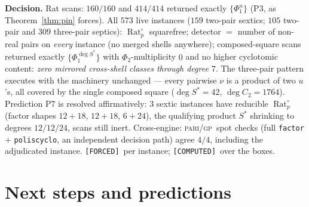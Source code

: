 \documentclass[11pt]{article}
\newcommand{\F}{\textnormal{\texttt{[FORCED]}}}
\newcommand{\C}{\textnormal{\texttt{[COMPUTED]}}}
\newcommand{\Rat}{\operatorname{Rat}}
\newcommand{\gp}{\textsc{pari/gp}}
\theoremstyle{definition}
\begin{document}
\textbf{Decision.} Rat scans: $160/160$ and $414/414$ returned exactly
$\{\Phi_1^{n}\}$ (P3, as Theorem~\ref{thm:pin} forces). All $573$ live
instances ($159$ two-pair sextics; $105$ two-pair and $309$ three-pair
septics): $\Rat_p^{\circ}$ squarefree; detector $=$ number of non-real
pairs on \emph{every} instance (no merged shells anywhere); composed-square
scans returned exactly $\{\Phi_1^{\deg S^{*}}\}$ with $\Phi_2$-multiplicity
$0$ and no higher cyclotomic content: \emph{zero mirrored cross-shell
classes through degree $7$}. The three-pair pattern executes with the
machinery unchanged --- every pairwise $\nu$ is a product of two $u$'s,
all covered by the single composed square ($\deg S^{*}=42$,
$\deg C_2=1764$). Prediction P7 is resolved affirmatively: $3$ sextic
instances have reducible $\Rat_p^{\circ}$ (factor shapes $12{+}18$,
$12{+}18$, $6{+}24$), the qualifying product $S^{*}$ shrinking to degrees
$12/12/24$, scans still inert. Cross-engine: \gp\ spot checks (full
\texttt{factor} $+$ \texttt{poliscyclo}, an independent decision path)
agree $4/4$, including the adjudicated instance. \F\ per instance; \C\
over the boxes.

\section{Next steps and predictions}\label{sec:next}
\end{document}
